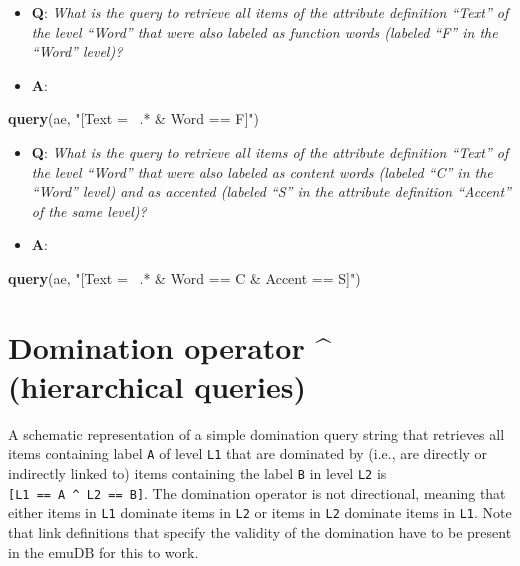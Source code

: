 \documentclass[]{book}
\newenvironment{Shaded}{\begin{snugshade}}{\end{snugshade}}
\newcommand{\KeywordTok}[1]{\textcolor[rgb]{0.13,0.29,0.53}{\textbf{#1}}}
\newcommand{\NormalTok}[1]{#1}
\newcommand{\StringTok}[1]{\textcolor[rgb]{0.31,0.60,0.02}{#1}}
\providecommand{\tightlist}{%
  \setlength{\itemsep}{0pt}\setlength{\parskip}{0pt}}
\begin{document}
\begin{itemize}
\tightlist
\item
  \textbf{Q}: \emph{What is the query to retrieve all items of the attribute definition ``Text'' of the level ``Word'' that were also labeled as function words (labeled ``F'' in the ``Word'' level)?}
\item
  \textbf{A}:
\end{itemize}

\begin{Shaded}
\begin{Highlighting}[]
\KeywordTok{query}\NormalTok{(ae, }\StringTok{"[Text =~ .* & Word == F]"}\NormalTok{)}
\end{Highlighting}
\end{Shaded}

\begin{itemize}
\tightlist
\item
  \textbf{Q}: \emph{What is the query to retrieve all items of the attribute definition ``Text'' of the level ``Word'' that were also labeled as content words (labeled ``C'' in the ``Word'' level) and as accented (labeled ``S'' in the attribute definition ``Accent'' of the same level)?}
\item
  \textbf{A}:
\end{itemize}

\begin{Shaded}
\begin{Highlighting}[]
\KeywordTok{query}\NormalTok{(ae, }\StringTok{"[Text =~ .* & Word == C & Accent == S]"}\NormalTok{)}
\end{Highlighting}
\end{Shaded}

\hypertarget{domination-operator-hierarchical-queries}{%
\section{Domination operator \^{} (hierarchical queries)}\label{domination-operator-hierarchical-queries}}

A schematic representation of a simple domination query string that retrieves all items containing label \texttt{A} of level \texttt{L1} that are dominated by (i.e., are directly or indirectly linked to) items containing the label \texttt{B} in level \texttt{L2} is \texttt{{[}L1\ ==\ A\ \^{}\ L2\ ==\ B{]}}. The domination operator is not directional, meaning that either items in \texttt{L1} dominate items in \texttt{L2} or items in \texttt{L2} dominate items in \texttt{L1}. Note that link definitions that specify the validity of the domination have to be present in the emuDB for this to work.
\end{document}
